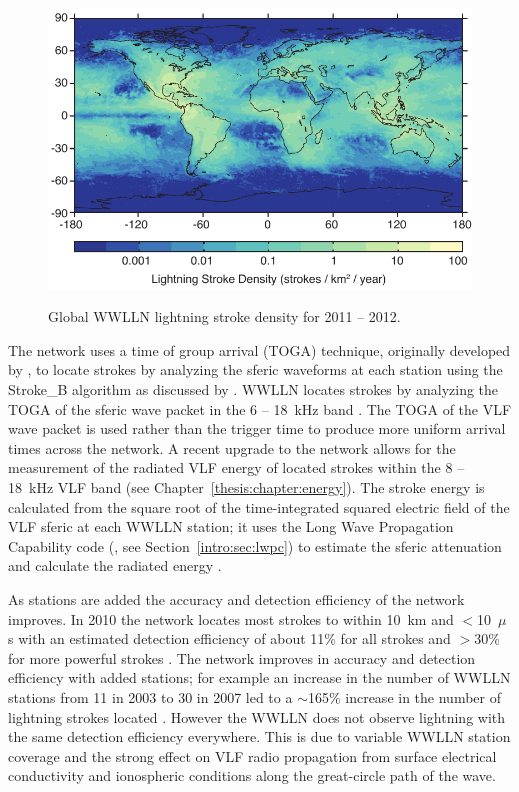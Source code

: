 \begin{figure}[ht!]
	\centering
	\includegraphics[scale=1]{Introduction/Figures/wwlln_density.pdf}\\
	\caption{Global WWLLN lightning stroke density for 2011 -- 2012.}
	\label{intro:fig:wwlln}
\end{figure}

The network uses a time of group arrival (TOGA) technique, originally developed by \citet{Dowden2002d}, to locate strokes by analyzing the sferic waveforms at each station using the Stroke\_B algorithm as discussed by \citet{Rodger2006,Rodger2009}.
WWLLN locates strokes by analyzing the TOGA of the sferic wave packet in the 6 -- 18~kHz band \citep{Dowden2000}.
The TOGA of the VLF wave packet is used rather than the trigger time to produce more uniform arrival times across the network.
A recent upgrade to the network allows for the measurement of the radiated VLF energy of located strokes within the 8 -- 18~kHz VLF band (see Chapter~\ref{thesis:chapter:energy}).
The stroke energy is calculated from the square root of the time-integrated squared electric field of the VLF sferic at each WWLLN station; it uses the Long Wave Propagation Capability code (\citet{Ferguson1998}, see Section~\ref{intro:sec:lwpc}) to estimate the sferic attenuation and calculate the radiated energy \citep{Hutchins2012}.

As stations are added the accuracy and detection efficiency of the network improves.
In 2010 the network locates most strokes to within 10~km and $<$10~$\mu$s with an estimated detection efficiency of about 11\% for all strokes and $>$30\% for more powerful strokes \citep{Abarca2010,Rodger2009}.
The network improves in accuracy and detection efficiency with added stations; for example an increase in the number of WWLLN stations from 11 in 2003 to 30 in 2007 led to a $\sim$165\% increase in the number of lightning strokes located \citep{Rodger2009}.
However the WWLLN does not observe lightning with the same detection efficiency everywhere.
This is due to variable WWLLN station coverage and the strong effect on VLF radio propagation from surface electrical conductivity and ionospheric conditions along the great-circle path of the wave.

